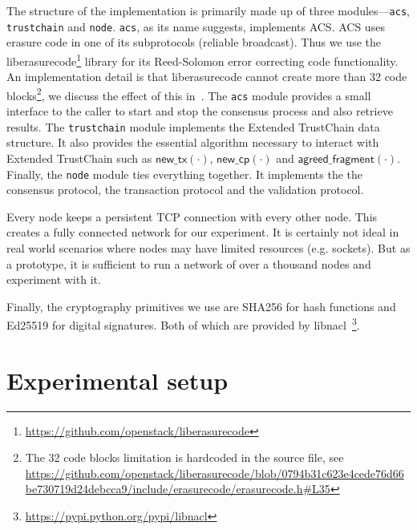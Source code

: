The structure of the implementation is primarily made up of three modules---\texttt{acs}, \texttt{trustchain} and \texttt{node}.
\texttt{acs}, as its name suggests, implements ACS.
ACS uses erasure code in one of its subprotocols (reliable broadcast).
Thus we use the liberasurecode\footnote{\url{https://github.com/openstack/liberasurecode}} library for its Reed-Solomon error correcting code functionality.
An implementation detail is that liberasurecode cannot create more than 32 code blocks\footnote{
  The 32 code blocks limitation is hardcoded in the source file, see
  \url{https://github.com/openstack/liberasurecode/blob/0794b31c623e4cede76d66be730719d24debcca9/include/erasurecode/erasurecode.h\#L35}
}, we discuss the effect of this in~.
The \texttt{acs} module provides a small interface to the caller to start and stop the consensus process and also retrieve results.
The \texttt{trustchain} module implements the Extended TrustChain data structure.
It also provides the essential algorithm necessary to interact with Extended TrustChain such as 
$\textsf{new\_tx}(\cdot)$, $\textsf{new\_cp}(\cdot)$ and $\textsf{agreed\_fragment}(\cdot)$.
Finally, the \texttt{node} module ties everything together.
It implements the the consensus protocol, the transaction protocol and the validation protocol.


Every node keeps a persistent TCP connection with every other node.
This creates a fully connected network for our experiment.
It is certainly not ideal in real world scenarios where nodes may have limited resources (e.g. sockets).
But as a prototype, it is sufficient to run a network of over a thousand nodes and experiment with it.

Finally, the cryptography primitives we use are SHA256 for hash functions and Ed25519 for digital signatures.
Both of which are provided by libnacl~\footnote{\url{https://pypi.python.org/pypi/libnacl}}.


\section{Experimental setup}
\label{sec:experimental-setup}

